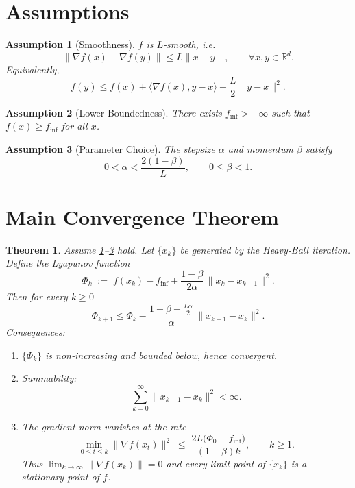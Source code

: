 \documentclass{article}
\newtheorem{theorem}{Theorem}[section]
\newtheorem{assumption}{Assumption}[section]
\newcommand{\grad}{\nabla}
\begin{document}
\newpage
\section*{Assumptions}
\begin{assumption}[Smoothness]\label{as:smooth}
$f$ is $L$‑smooth, i.e.
\[
\|\grad f(x)-\grad f(y)\|\le L\|x-y\|,\qquad\forall x,y\in\mathbb{R}^d .
\]
Equivalently,
\[
f(y)\le f(x)+\langle\grad f(x),y-x\rangle+\frac{L}{2}\|y-x\|^2 .
\tag{A1}
\]
\end{assumption}
\begin{assumption}[Lower Boundedness]\label{as:lb}
There exists $f_{\inf}>-\infty$ such that $f(x)\ge f_{\inf}$ for all $x$.
\end{assumption}
\begin{assumption}[Parameter Choice]\label{as:param}
The stepsize $\alpha$ and momentum $\beta$ satisfy
\[
0<\alpha<\frac{2(1-\beta)}{L},\qquad 0\le\beta<1 .
\tag{A2}
\]
\end{assumption}

\section*{Main Convergence Theorem}
\begin{theorem}\label{thm:hb}
Assume \ref{as:smooth}–\ref{as:param} hold.  Let $\{x_k\}$ be generated by the Heavy‑Ball iteration.  Define the Lyapunov function
\[
\Phi_k \;:=\; f(x_k)-f_{\inf}
          +\frac{1-\beta}{2\alpha}\,\|x_k-x_{k-1}\|^2 .
\]
Then for every $k\ge 0$
\[
\Phi_{k+1}\le \Phi_k -\frac{1-\beta-\frac{L\alpha}{2}}{\alpha}\,
                 \|x_{k+1}-x_k\|^2 . \tag{B1}
\]
Consequences:
\begin{enumerate}[label=(\roman*)]
\item $\{\Phi_k\}$ is non‑increasing and bounded below, hence convergent.
\item Summability:
\[
\sum_{k=0}^{\infty}\|x_{k+1}-x_k\|^2 <\infty .
\tag{B2}
\]
\item The gradient norm vanishes at the rate
\[
\min_{0\le t\le k}\|\grad f(x_t)\|^2
   \;\le\; \frac{2L\bigl(\Phi_0-f_{\inf}\bigr)}{(1-\beta)k},
\qquad k\ge 1 .
\tag{B3}
\]
Thus $\displaystyle\lim_{k\to\infty}\|\grad f(x_k)\|=0$ and every limit point
of $\{x_k\}$ is a stationary point of $f$.
\end{enumerate}
\end{theorem}
\end{document}
